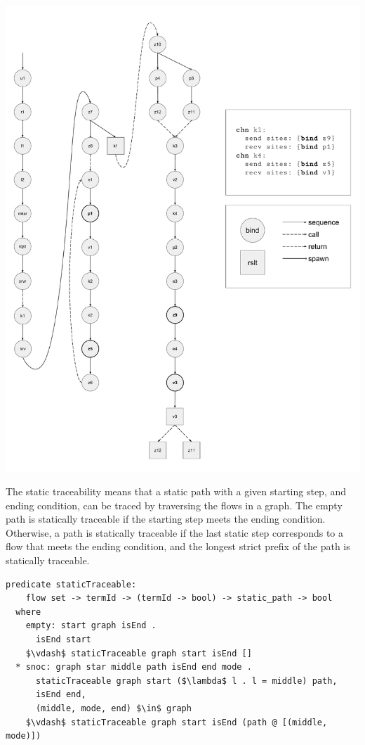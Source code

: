 \documentclass[letterpaper, 11pt]{extarticle}
\begin{document}
\includegraphics[width=.9\textwidth]{cml-graph.pdf}

The static traceability means that a static path with a given starting step, and ending
condition, can be traced by traversing the flows in a graph.
The empty path is statically traceable if the starting step meets the ending condition.
Otherwise, a path is statically traceable if the last static step corresponds to a flow
that meets the ending condition, and the longest strict prefix of the path is statically
traceable. 

\begin{lstlisting}[language=logic, mathescape]
  predicate staticTraceable:
    flow set -> termId -> (termId -> bool) -> static_path -> bool
  where
    empty: start graph isEnd .
      isEnd start
    $\vdash$ staticTraceable graph start isEnd []
  * snoc: graph star middle path isEnd end mode .
      staticTraceable graph start ($\lambda$ l . l = middle) path, 
      isEnd end, 
      (middle, mode, end) $\in$ graph 
    $\vdash$ staticTraceable graph start isEnd (path @ [(middle, mode)])
\end{lstlisting}
\end{document}
